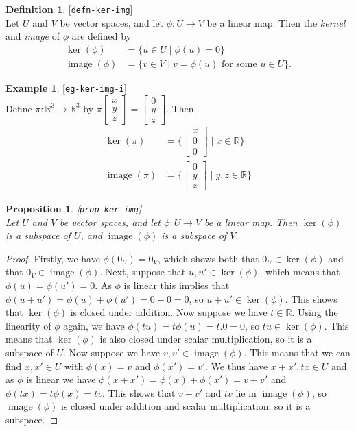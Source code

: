\documentclass{amsart}
\newcommand{\lbl}[1]{\label{#1}\textup{[\texttt{#1}]}\ \\}
\newcommand{\lbl}{\label}
\newcommand{\R}         {{\mathbb{R}}}
\newcommand{\img}       {\operatorname{image}}
\newcommand{\bsm}       {\left[\begin{smallmatrix}}
\newcommand{\esm}       {\end{smallmatrix}\right]}
\newcommand{\xra}       {\xrightarrow}
\newcommand{\st}        {\;|\;}
\renewcommand{\:}       {\colon}
\newtheorem{proposition}[theorem]{Proposition}
\theoremstyle{definition}
\newtheorem{definition}[theorem]{Definition}
\newtheorem{example}[theorem]{Example}
\begin{document}
\begin{definition}\lbl{defn-ker-img}
 Let $U$ and $V$ be vector spaces, and let $\phi\:U\xra{}V$
 be a linear map.  Then the \emph{kernel} and \emph{image} of $\phi$
 are defined by
 \begin{align*}
   \ker(\phi) &=
    \{u\in U\st \phi(u) = 0 \} \\
   \img(\phi) &=
    \{v\in V \st v = \phi(u) \text{ for some } u\in U\}.
 \end{align*}
\end{definition}
\begin{example}\lbl{eg-ker-img-i}
 Define $\pi\:\R^3\to\R^3$ by
 $\pi\bsm x\\ y\\ z\esm=\bsm 0\\ y\\ z\esm$.  Then
 \begin{align*}
  \ker(\pi) &= \{\bsm x\\ 0\\ 0\esm\st x\in\R\} \\
  \img(\pi) &= \{\bsm 0\\ y\\ z\esm\st y,z\in\R\}
 \end{align*}
\end{example}

\begin{proposition}\lbl{prop-ker-img}
 Let $U$ and $V$ be vector spaces, and let $\phi\:U\xra{}V$ be a
 linear map.  Then $\ker(\phi)$ is a subspace of $U$, and
 $\img(\phi)$ is a subspace of $V$.
\end{proposition}
\begin{proof}
 Firstly, we have $\phi(0_U)=0_V$, which shows both that
 $0_U\in\ker(\phi)$ and that $0_V\in\img(\phi)$.  Next,
 suppose that $u,u'\in\ker(\phi)$, which means that
 $\phi(u)=\phi(u')=0$.  As $\phi$ is linear this implies
 that $\phi(u+u')=\phi(u)+\phi(u')=0+0=0$, so
 $u+u'\in\ker(\phi)$.  This shows that $\ker(\phi)$ is
 closed under addition.  Now suppose we have $t\in\R$.
 Using the linearity of $\phi$ again, we have
 $\phi(tu)=t\phi(u)=t.0=0$, so $tu\in\ker(\phi)$.  This
 means that $\ker(\phi)$ is also closed under scalar
 multiplication, so it is a subspace of $U$.  Now suppose we
 have $v,v'\in\img(\phi)$.  This means that we can find
 $x,x'\in U$ with $\phi(x)=v$ and $\phi(x')=v'$.  We thus
 have $x+x',tx\in U$ and as $\phi$ is linear we have
 $\phi(x+x')=\phi(x)+\phi(x')=v+v'$ and
 $\phi(tx)=t\phi(x)=tv$.  This shows that $v+v'$ and $tv$
 lie in $\img(\phi)$, so $\img(\phi)$ is closed under
 addition and scalar multiplication, so it is a subspace. 
\end{proof}
\end{document}
